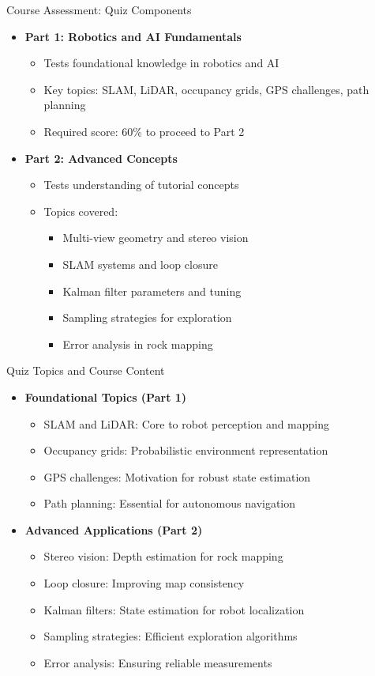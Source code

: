 \documentclass[aspectratio=169]{beamer}
\begin{document}
\begin{frame}{Course Assessment: Quiz Components}
\begin{itemize}
    \item \textbf{Part 1: Robotics and AI Fundamentals}
    \begin{itemize}
        \item Tests foundational knowledge in robotics and AI
        \item Key topics: SLAM, LiDAR, occupancy grids, GPS challenges, path planning
        \item Required score: 60\% to proceed to Part 2
    \end{itemize}
    \item \textbf{Part 2: Advanced Concepts}
    \begin{itemize}
        \item Tests understanding of tutorial concepts
        \item Topics covered:
        \begin{itemize}
            \item Multi-view geometry and stereo vision
            \item SLAM systems and loop closure
            \item Kalman filter parameters and tuning
            \item Sampling strategies for exploration
            \item Error analysis in rock mapping
        \end{itemize}
    \end{itemize}
\end{itemize}
\end{frame}

\begin{frame}{Quiz Topics and Course Content}
\begin{itemize}
    \item \textbf{Foundational Topics (Part 1)}
    \begin{itemize}
        \item SLAM and LiDAR: Core to robot perception and mapping
        \item Occupancy grids: Probabilistic environment representation
        \item GPS challenges: Motivation for robust state estimation
        \item Path planning: Essential for autonomous navigation
    \end{itemize}
    \item \textbf{Advanced Applications (Part 2)}
    \begin{itemize}
        \item Stereo vision: Depth estimation for rock mapping
        \item Loop closure: Improving map consistency
        \item Kalman filters: State estimation for robot localization
        \item Sampling strategies: Efficient exploration algorithms
        \item Error analysis: Ensuring reliable measurements
    \end{itemize}
\end{itemize}
\end{frame}
\end{document}
